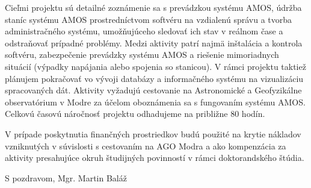 \documentclass[12pt, a4paper, oneside]{report}
\begin{document}
    Cieľmi projektu sú detailné zoznámenie sa s prevádzkou systému AMOS,
    údržba staníc systému AMOS prostredníctvom softvéru na vzdialenú správu
    a tvorba administračného systému, umožňujúceho sledovať ich stav v reálnom čase a odstraňovať prípadné problémy.
    Medzi aktivity patrí najmä inštalácia a kontrola softvéru, zabezpečenie prevádzky systému AMOS
    a riešenie mimoriadnych situácií (výpadky napájania alebo spojenia so stanicou).
    V rámci projektu taktiež plánujem pokračovať vo vývoji databázy a informačného systému na vizualizáciu spracovaných dát.
    Aktivity vyžadujú cestovanie na Astronomické a Geofyzikálne observatórium
    v Modre za účelom oboznámenia sa s fungovaním systému AMOS.
    Celkovú časovú náročnosť projektu odhadujeme na približne 80 hodín.

    V prípade poskytnutia finančných prostriedkov budú použité na krytie nákladov vzniknutých
    v súvislosti s cestovaním na AGO Modra a ako kompenzácia za aktivity presahujúce okruh študijných povinností
    v rámci doktorandského štúdia.

    \vspace*{6mm}

    S pozdravom,
    \hfill Mgr. Martin Baláž
\end{document}
